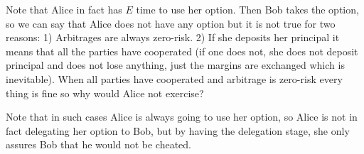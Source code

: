 Note that Alice in fact has $E$ time to use her option. Then Bob takes the option, so we can say that Alice does not have any option but it is not true for two reasons: 1) Arbitrages are always zero-risk. 2) If she deposits her principal it means that all the parties have cooperated (if one does not, she does not deposit principal and does not lose anything, just the margins are exchanged which is inevitable). When all parties have cooperated and arbitrage is zero-risk every thing is fine so why would Alice not exercise?

Note that in such cases Alice is always going to use her option, so Alice is not in fact delegating her option to Bob, but by having the delegation stage, she only assures Bob that he would not be cheated.

